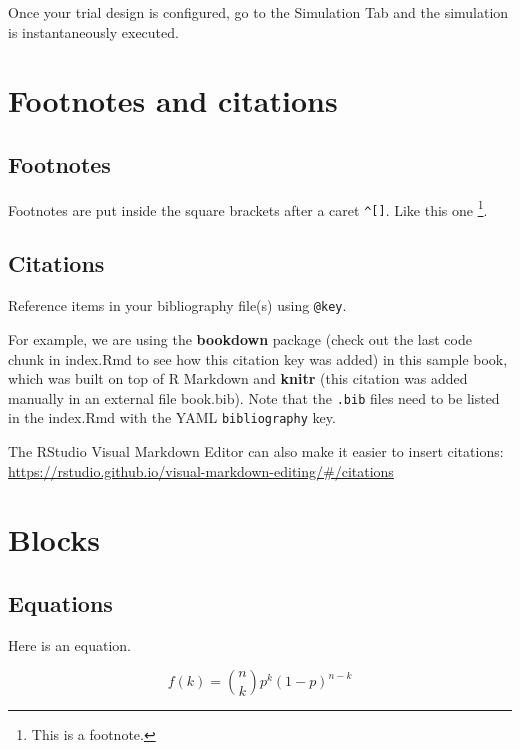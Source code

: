 \documentclass[
]{book}
\theoremstyle{definition}
\theoremstyle{definition}
\theoremstyle{definition}
\theoremstyle{definition}
\theoremstyle{remark}
\begin{document}
Once your trial design is configured, go to the Simulation Tab and the simulation is instantaneously executed.

\hypertarget{footnotes-and-citations}{%
\chapter{Footnotes and citations}\label{footnotes-and-citations}}

\hypertarget{footnotes}{%
\section{Footnotes}\label{footnotes}}

Footnotes are put inside the square brackets after a caret \texttt{\^{}{[}{]}}. Like this one \footnote{This is a footnote.}.

\hypertarget{citations}{%
\section{Citations}\label{citations}}

Reference items in your bibliography file(s) using \texttt{@key}.

For example, we are using the \textbf{bookdown} package \citep{R-bookdown} (check out the last code chunk in index.Rmd to see how this citation key was added) in this sample book, which was built on top of R Markdown and \textbf{knitr} \citep{xie2015} (this citation was added manually in an external file book.bib).
Note that the \texttt{.bib} files need to be listed in the index.Rmd with the YAML \texttt{bibliography} key.

The RStudio Visual Markdown Editor can also make it easier to insert citations: \url{https://rstudio.github.io/visual-markdown-editing/\#/citations}

\hypertarget{blocks}{%
\chapter{Blocks}\label{blocks}}

\hypertarget{equations}{%
\section{Equations}\label{equations}}

Here is an equation.

\begin{equation} 
  f\left(k\right) = \binom{n}{k} p^k\left(1-p\right)^{n-k}
  \label{eq:binom}
\end{equation}
\end{document}
